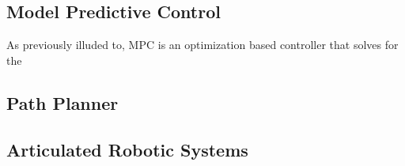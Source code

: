 \documentclass[journal]{IEEEtran}
\begin{document}
%
%
%
%
%
%
%
%
%
%
%
%

\subsection{Model Predictive Control}

As previously illuded to, MPC is an optimization based controller that solves for the



\subsection{Path Planner}

\subsection{Articulated Robotic Systems}
\end{document}
